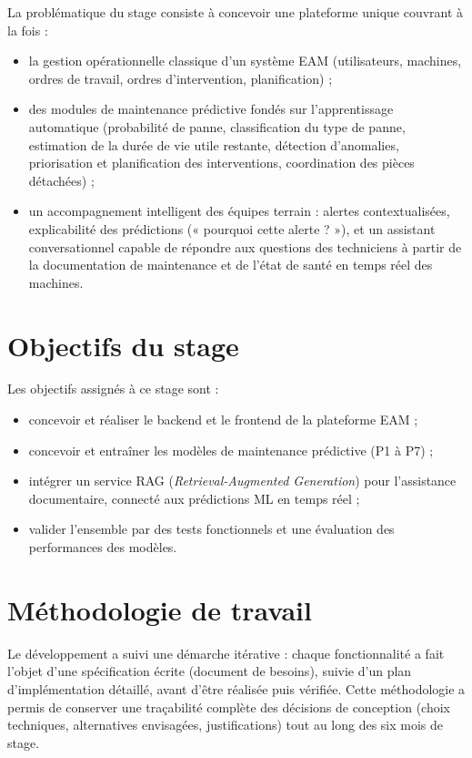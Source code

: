 La problématique du stage consiste à concevoir une plateforme unique couvrant à la fois :
\begin{itemize}
\item la gestion opérationnelle classique d'un système EAM (utilisateurs, machines, ordres de travail, ordres d'intervention, planification) ;
\item des modules de maintenance prédictive fondés sur l'apprentissage automatique (probabilité de panne, classification du type de panne, estimation de la durée de vie utile restante, détection d'anomalies, priorisation et planification des interventions, coordination des pièces détachées) ;
\item un accompagnement intelligent des équipes terrain : alertes contextualisées, explicabilité des prédictions (« pourquoi cette alerte ? »), et un assistant conversationnel capable de répondre aux questions des techniciens à partir de la documentation de maintenance et de l'état de santé en temps réel des machines.
\end{itemize}

\section{Objectifs du stage}

Les objectifs assignés à ce stage sont :
\begin{itemize}
\item concevoir et réaliser le backend et le frontend de la plateforme EAM ;
\item concevoir et entraîner les modèles de maintenance prédictive (P1 à P7) ;
\item intégrer un service RAG (\emph{Retrieval-Augmented Generation}) pour l'assistance documentaire, connecté aux prédictions ML en temps réel ;
\item valider l'ensemble par des tests fonctionnels et une évaluation des performances des modèles.
\end{itemize}

\section{Méthodologie de travail}
\label{sec:ml-methodology}

Le développement a suivi une démarche itérative : chaque fonctionnalité a fait l'objet d'une spécification écrite (document de besoins), suivie d'un plan d'implémentation détaillé, avant d'être réalisée puis vérifiée. Cette méthodologie a permis de conserver une traçabilité complète des décisions de conception (choix techniques, alternatives envisagées, justifications) tout au long des six mois de stage.

